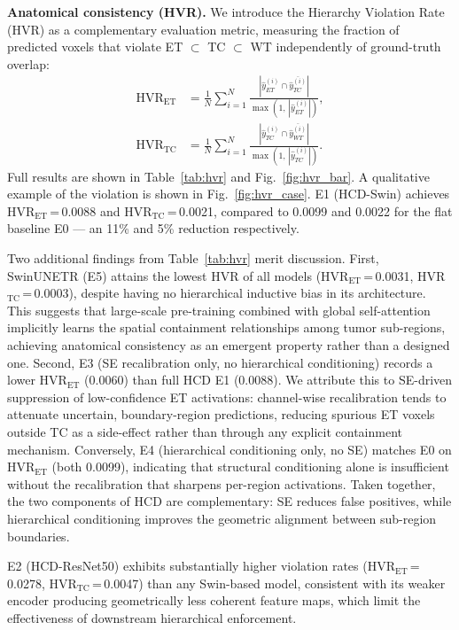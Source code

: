 \documentclass[conference]{IEEEtran}
\begin{document}
\textbf{Anatomical consistency (HVR).}
We introduce the Hierarchy Violation Rate (HVR) as a complementary
evaluation metric, measuring the fraction of predicted voxels that
violate ET $\subset$ TC $\subset$ WT independently of ground-truth
overlap:
\begin{align}
\text{HVR}_\text{ET} &= \frac{1}{N}\sum_{i=1}^{N}
  \frac{|\hat{y}_{ET}^{(i)} \cap \overline{\hat{y}_{TC}^{(i)}}|}
       {\max(1,\,|\hat{y}_{ET}^{(i)}|)}, \\
\text{HVR}_\text{TC} &= \frac{1}{N}\sum_{i=1}^{N}
  \frac{|\hat{y}_{TC}^{(i)} \cap \overline{\hat{y}_{WT}^{(i)}}|}
       {\max(1,\,|\hat{y}_{TC}^{(i)}|)}.
\end{align}
Full results are shown in Table~\ref{tab:hvr} and Fig.~\ref{fig:hvr_bar}.
A qualitative example of the violation is shown in Fig.~\ref{fig:hvr_case}.
E1 (HCD-Swin) achieves HVR$_\text{ET}$\,=\,0.0088 and
HVR$_\text{TC}$\,=\,0.0021, compared to 0.0099 and 0.0022 for the
flat baseline E0 --- an 11\% and 5\% reduction respectively.

Two additional findings from Table~\ref{tab:hvr} merit discussion.
First, SwinUNETR (E5) attains the lowest HVR of all models
(HVR$_\text{ET}$\,=\,0.0031, HVR$_\text{TC}$\,=\,0.0003), despite having
no hierarchical inductive bias in its architecture.
This suggests that large-scale pre-training combined with global
self-attention implicitly learns the spatial containment relationships
among tumor sub-regions, achieving anatomical consistency as an emergent
property rather than a designed one.
Second, E3 (SE recalibration only, no hierarchical conditioning)
records a lower HVR$_\text{ET}$ (0.0060) than full HCD E1 (0.0088).
We attribute this to SE-driven suppression of low-confidence ET activations:
channel-wise recalibration tends to attenuate uncertain, boundary-region
predictions, reducing spurious ET voxels outside TC as a side-effect rather
than through any explicit containment mechanism.
Conversely, E4 (hierarchical conditioning only, no SE) matches E0 on
HVR$_\text{ET}$ (both 0.0099), indicating that structural conditioning
alone is insufficient without the recalibration that sharpens
per-region activations.
Taken together, the two components of HCD are complementary: SE
reduces false positives, while hierarchical conditioning improves
the geometric alignment between sub-region boundaries.

E2 (HCD-ResNet50) exhibits substantially higher violation rates
(HVR$_\text{ET}$\,=\,0.0278, HVR$_\text{TC}$\,=\,0.0047) than any
Swin-based model, consistent with its weaker encoder producing
geometrically less coherent feature maps, which limit the effectiveness
of downstream hierarchical enforcement.
\end{document}
